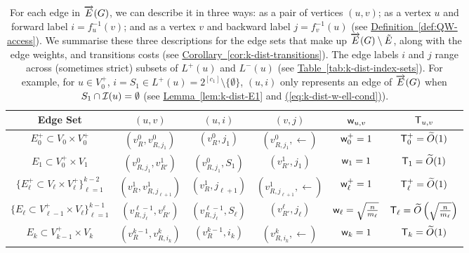 \documentclass{theoretics}
\newcommand{\eq}[1]{\hyperref[eq:#1]{(\ref*{eq:#1})}}
\newcommand{\lem}[1]{\hyperref[lem:#1]{Lemma~\ref*{lem:#1}}}
\newcommand{\cor}[1]{\hyperref[cor:#1]{Corollary~\ref*{cor:#1}}}
\newcommand{\tabl}[1]{\hyperref[tab:#1]{Table~\ref*{tab:#1}}}
\newcommand{\defin}[1]{\hyperref[def:#1]{Definition~\ref*{def:#1}}}
\renewcommand{\>}{\rangle}
\newcommand{\<}{\langle}
\renewcommand{\(}{\left(}
\renewcommand{\)}{\right)}
\def\w{{\sf w}}
\begin{document}
\begin{table}
	\renewcommand{\arraystretch}{1.5}
	\centering
	\begin{tabular}{ |c|c|c|c|c|c| }
		\hline
		Edge Set & $(u,v)$ & $(u,i)$ & $(v,j)$ & $\w_{u,v}$ & ${\sf T}_{u,v}$\\
		\hline
		\hline
		$E_0^+\subset V_0\times V_0^+$ & $(v^0_R,v^0_{R,j_1})$ & $(v^0_R,j_1)$ & $(v^0_{R,j_1},\leftarrow) $  & $\w_0^+=1$ & ${\sf T}_0^+=\widetilde{O}(1)$\\
		\hline
		$E_1\subset V_0^+\times V_1$ & $(v^0_{R,j_1},v^1_{R'})$ & $(v^0_{R,j_1},S_1)$ & $(v^1_{R'},j_1) $  & $\w_1=1$ & ${\sf T}_1=\widetilde{O}(1)$\\
		\hline
		$\{E_\ell^+\subset V_{\ell}\times V_{\ell}^+\}_{\ell=1}^{k-2}$ & $(v^1_{R},v^1_{R,j_{\ell+1}})$ & $(v^1_{R},j_{\ell+1})$ & $(v^1_{R,j_{\ell+1}},\leftarrow)$  & $\w_{\ell}^+=1$ & ${\sf T}_{\ell}^+=\widetilde{O}(1)$\\
		\hline
		$\{E_\ell\subset V_{\ell-1}^+\times V_{\ell}\}_{\ell=1}^{k-1}$ & $(v^{\ell-1}_{R,j_{\ell}},v^{\ell}_{R'})$ & $(v^{\ell-1}_{R,j_{\ell}},S_{\ell})$ & $(v^{\ell}_{R'},j_{\ell})$  & $\w_{\ell}=\sqrt{\frac{n}{m_{\ell}}}$ & ${\sf T}_{\ell}=\widetilde{O}\left(\sqrt{\frac{n}{m_{\ell}}}\right)$\\
		\hline
		$E_k\subset V_{k-1}^+\times V_k$ & $(v^{k-1}_{R},v^k_{R,i_k})$ & $(v^{k-1}_{R},i_k)$ & $(v^k_{R,i_k},\leftarrow)$  & $\w_k=1$ & ${\sf T}_k=\widetilde{O}(1)$\\
		\hline
	\end{tabular}
	\caption{
For each edge in $\protect\overrightarrow{E}(G)$, we can describe it in three ways: as a pair of vertices $(u,v)$; as a vertex $u$ and forward label $i=f_u^{-1}(v)$; and as a vertex $v$ and backward label $j=f_v^{-1}(u)$ (see \defin{QW-access}). We summarise these three descriptions for the edge sets that make up $\protect\overrightarrow{E}(G)\setminus\tilde{E}$, along with the edge weights, and transitions costs (see \cor{k-dist-transitions}). The edge labels $i$ and $j$ range across (sometimes strict) subsets of $L^+(u)$ and $L^-(u)$ (see \tabl{k-dist-index-sets}). For example, for $u\in V_0^+$, $i=S_1\in L^+(u)=2^{[c_1]}\setminus\{\emptyset\}$, $(u,i)$ only represents an edge of $\protect\overrightarrow{E}(G)$ when $S_1\cap {\cal I}(u)=\emptyset$ (see \lem{k-dist-E1} and \eq{k-dist-w-ell-cond}).}\label{tab:k-dist-edges}
\end{table}
\end{document}
